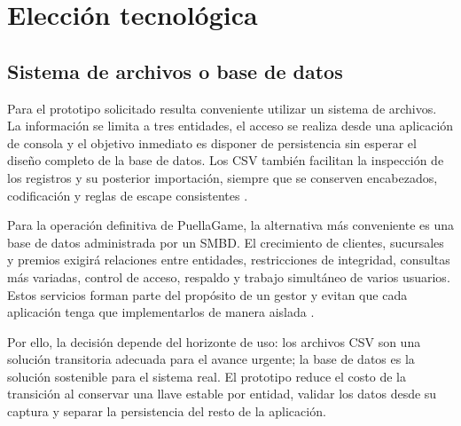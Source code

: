 \section{Elección tecnológica}
\subsection{Sistema de archivos o base de datos}

Para el prototipo solicitado resulta conveniente utilizar un sistema de
archivos. La información se limita a tres entidades, el acceso se realiza desde
una aplicación de consola y el objetivo inmediato es disponer de persistencia
sin esperar el diseño completo de la base de datos. Los CSV también facilitan
la inspección de los registros y su posterior importación, siempre que se
conserven encabezados, codificación y reglas de escape consistentes
\cite{shafranovich2005}.

Para la operación definitiva de PuellaGame, la alternativa más conveniente es
una base de datos administrada por un SMBD. El crecimiento de clientes,
sucursales y premios exigirá relaciones entre entidades, restricciones de
integridad, consultas más variadas, control de acceso, respaldo y trabajo
simultáneo de varios usuarios. Estos servicios forman parte del propósito de un
gestor y evitan que cada aplicación tenga que implementarlos de manera aislada
\cite{elmasri2016,silberschatz2019}.

Por ello, la decisión depende del horizonte de uso: los archivos CSV son una
solución transitoria adecuada para el avance urgente; la base de datos es la
solución sostenible para el sistema real. El prototipo reduce el costo de la
transición al conservar una llave estable por entidad, validar los datos desde
su captura y separar la persistencia del resto de la aplicación.
